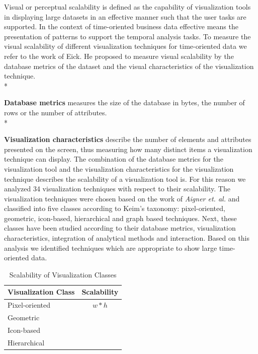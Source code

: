 Visual or perceptual scalability is defined as the capability of visualization tools in displaying large datasets in an effective manner\cite{Eick2002} such that the user tasks are supported. In the context of time-oriented business data effective means the presentation of patterns to support the temporal analysis tasks. To measure the visual scalability of different visualization techniques for time-oriented data we refer to the work of Eick\cite{Eick2002}. He proposed to measure visual scalability by the database metrics of the dataset and the visual characteristics of the visualization technique.\\*

\textbf{Database metrics} measures the size of the database in bytes, the number of rows or the number of attributes. \\*

\textbf{Visualization characteristics} describe the number of elements and attributes presented on the screen, thus measuring how many distinct items a visualization technique can display.
The combination of the database metrics for the visualization tool and the visualization characteristics for the visualization technique describes the scalability of a visualization tool is. For this reason we analyzed 34 visualization techniques with respect to their scalability. The visualization techniques were chosen based on the work of \textit{Aigner et. al.}\cite{Aigner2011} and classified into five classes according to Keim's taxonomy\cite{Keim2002}: pixel-oriented, geometric, icon-based, hierarchical and graph based techniques. Next, these classes have been studied according to their database metrics, visualization characteristics, integration of analytical methods and interaction. Based on this analysis we identified  techniques which are appropriate to show large time-oriented data. 

\begin{table}[th]
	\centering
	\caption{Scalability of Visualization Classes}
	\label{vizScalability}
	\begin{tabu}{ l | c }
	\toprule
	Visualization Class & Scalability\\
	\midrule
	Pixel-oriented &  $w*h$ \\
	Geometric &  \\
	Icon-based &  \\
	Hierarchical &   \\
	\bottomrule
	\end{tabu}
\end{table}

